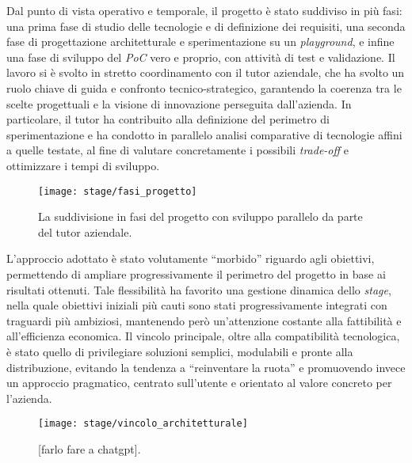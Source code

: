 Dal punto di vista operativo e temporale, il progetto è stato suddiviso in più fasi: una prima fase di studio delle tecnologie e di definizione dei requisiti, 
una seconda fase di progettazione architetturale e sperimentazione su un \emph{playground}, e infine una fase di sviluppo del \emph{PoC} vero e proprio, con attività di test e validazione. 
Il lavoro si è svolto in stretto coordinamento con il tutor aziendale, che ha svolto un ruolo chiave di guida e confronto tecnico-strategico, garantendo la coerenza tra 
le scelte progettuali e la visione di innovazione perseguita dall’azienda. 
In particolare, il tutor ha contribuito alla definizione del perimetro di sperimentazione e 
ha condotto in parallelo analisi comparative di tecnologie affini a quelle testate, al fine di valutare concretamente i possibili \emph{trade-off} e ottimizzare i tempi di sviluppo.
\begin{figure}[htbp]
    \centering
    \texttt{[image: stage/fasi\_progetto]}
    \caption{La suddivisione in fasi del progetto con sviluppo parallelo da parte del tutor aziendale.}
    \label{fig:fasi_progetto}
  \end{figure}
L’approccio adottato è stato volutamente “morbido” riguardo agli obiettivi, permettendo di ampliare progressivamente il perimetro del progetto in base ai risultati ottenuti. 
Tale flessibilità ha favorito una gestione dinamica dello \emph{stage}, nella quale obiettivi iniziali più cauti sono stati progressivamente integrati con traguardi più ambiziosi, 
mantenendo però un’attenzione costante alla fattibilità e all’efficienza economica. 
Il vincolo principale, oltre alla compatibilità tecnologica, è stato quello di privilegiare soluzioni semplici, modulabili e pronte alla distribuzione, evitando la tendenza a “reinventare la ruota” 
e promuovendo invece un approccio pragmatico, centrato sull’utente e orientato al valore concreto per l’azienda.
\begin{figure}[htbp]
    \centering
    \texttt{[image: stage/vincolo\_architetturale]}
    \caption{[farlo fare a chatgpt].}
    \label{fig:vincolo_architetturale}
  \end{figure}

